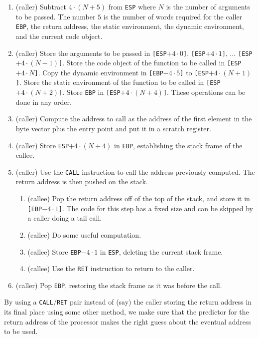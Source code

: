 \begin{enumerate}
\item (caller) Subtract $4 \cdot (N + 5)$ from \texttt{ESP} where $N$
  is the number of arguments to be passed.  The number $5$ is the
  number of words required for the caller \texttt{EBP}, the return
  address, the static environment, the dynamic environment, and the
  current code object.
\item (caller) Store the arguments to be passed in
  \texttt{[ESP$+ 4 \cdot 0$]}, 
  \texttt{[ESP$+ 4 \cdot 1$]}, 
  $\ldots$
  \texttt{[ESP$+ 4 \cdot (N - 1)$]}.
  Store the code object of the function to be called in 
  \texttt{[ESP$+4 \cdot N$]}.  
  Copy the dynamic environment in 
  \texttt{[EBP$-4 \cdot 5$]} to 
  \texttt{[ESP$+4 \cdot (N + 1)$]}.  
  Store the static environment of the function to be called in 
  \texttt{[ESP$+4 \cdot (N + 2)$]}.    
  Store \texttt{EBP} in  
  \texttt{[ESP$+4 \cdot (N + 4)$]}.  
  These operations can be done in any order.
\item (caller) Compute the address to call as the address of the first
  element in the byte vector plus the entry point and put it in a
  scratch register.
\item (caller) Store \texttt{ESP$+4 \cdot (N + 4)$} in \texttt{EBP},
  establishing the stack frame of the callee.
\item (caller) Use the \texttt{CALL} instruction to call the address
  previously computed.  The return address is then pushed on the
  stack. 
  \begin{enumerate}
  \item (callee) Pop the return address off of the top of the stack,
    and store it in \texttt{[EBP$- 4 \cdot 1$]}.  The code for this
    step has a fixed size and can be skipped by a caller doing a tail
    call.
  \item (callee) Do some useful computation.
  \item (callee) Store \texttt{EBP$- 4 \cdot 1$} in \texttt{ESP},
    deleting the current stack frame.
  \item (callee) Use the \texttt{RET} instruction to return to the
    caller.
  \end{enumerate}
\item (caller) Pop \texttt{EBP}, restoring the stack frame as it was
  before the call.
\end{enumerate}

By using a \texttt{CALL}/\texttt{RET} pair instead of (say) the caller
storing the return address in its final place using some other method,
we make sure that the predictor for the return address of the
processor makes the right guess about the eventual address to be
used. 


